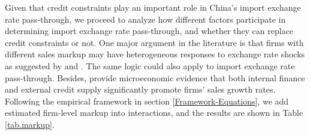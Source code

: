 \documentclass[12pt]{article}
\begin{document}
Given that credit constraints play an important role in China's import exchange rate pass-through, we proceed to analyze how different factors participate in determining import exchange rate pass-through, and whether they can replace credit constraints or not. One major argument in the literature is that firms with different sales markup may have heterogeneous responses to exchange rate shocks as suggested by \cite{bmm2012} and \cite{lmx2015}. The same logic could also apply to import exchange rate pass-through. Besides, \cite{llz2018} provide microeconomic evidence that both internal finance and external credit supply significantly promote firms' sales growth rates. Following the empirical framework in section \ref{Framework-Equations}, we add estimated firm-level markup into interactions, and the results are shown in Table \ref{tab.markup}.
\end{document}
